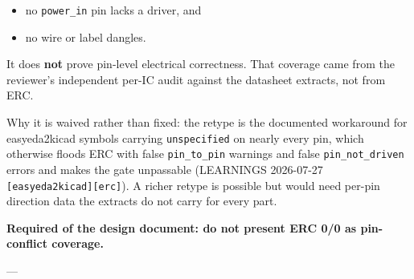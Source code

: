 \documentclass[11pt,a4paper]{article}
\begin{document}
\begin{itemize}
\item no \texttt{power\_in} pin lacks a driver, and
\item no wire or label dangles.
\end{itemize}
It does \textbf{not} prove pin-level electrical correctness. That coverage came from the reviewer's independent per-IC audit against the datasheet extracts, not from ERC.

Why it is waived rather than fixed: the retype is the documented workaround for easyeda2kicad symbols carrying \texttt{unspecified} on nearly every pin, which otherwise floods ERC with false \texttt{pin\_to\_pin} warnings and false \texttt{pin\_not\_driven} errors and makes the gate unpassable (LEARNINGS 2026-07-27 \texttt{{[}easyeda2kicad{]}{[}erc{]}}). A richer retype is possible but would need per-pin direction data the extracts do not carry for every part.

\textbf{Required of the design document: do not present ERC 0/0 as pin-conflict coverage.}

---
\end{document}
